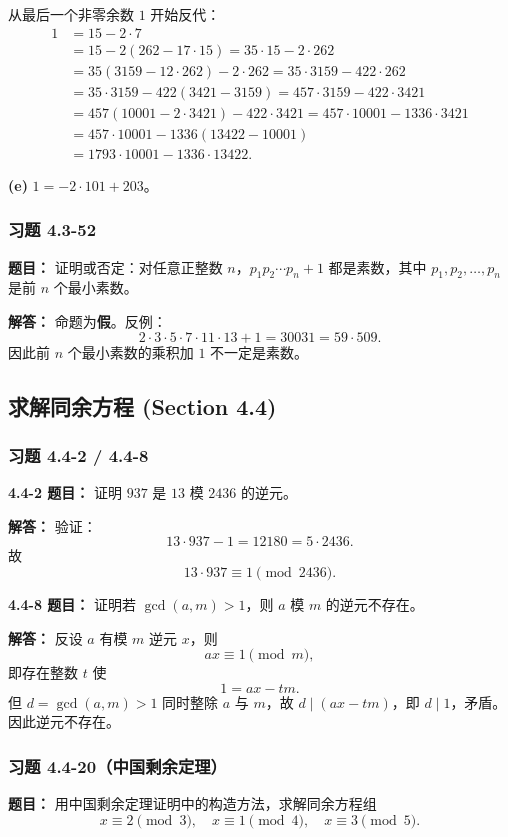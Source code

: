 \documentclass[11pt,UTF8]{article}
\begin{document}
从最后一个非零余数 $1$ 开始反代：
\begin{align*}
1 &= 15 - 2\cdot 7 \\
&= 15 - 2(262 - 17\cdot 15) = 35\cdot 15 - 2\cdot 262 \\
&= 35(3159 - 12\cdot 262) - 2\cdot 262 = 35\cdot 3159 - 422\cdot 262 \\
&= 35\cdot 3159 - 422(3421 - 3159) = 457\cdot 3159 - 422\cdot 3421 \\
&= 457(10001 - 2\cdot 3421) - 422\cdot 3421 = 457\cdot 10001 - 1336\cdot 3421 \\
&= 457\cdot 10001 - 1336(13422 - 10001) \\
&= \boxed{1793\cdot 10001 - 1336\cdot 13422}.
\end{align*}

\textbf{(e)} $\boxed{1 = -2\cdot 101 + 203}$。

\subsubsection*{习题 4.3-52}
\textbf{题目：} 证明或否定：对任意正整数 $n$，$p_1p_2\cdots p_n+1$ 都是素数，其中 $p_1,p_2,\dots,p_n$ 是前 $n$ 个最小素数。

\textbf{解答：} 命题为\textbf{假}。反例：
\[ 2\cdot 3\cdot 5\cdot 7\cdot 11\cdot 13 + 1 = 30031 = 59\cdot 509. \]
因此前 $n$ 个最小素数的乘积加 $1$ 不一定是素数。



\subsection{求解同余方程 (Section 4.4)}

\subsubsection*{习题 4.4-2 / 4.4-8}

\textbf{4.4-2 题目：} 证明 $937$ 是 $13$ 模 $2436$ 的逆元。

\textbf{解答：} 验证：
\[ 13\cdot 937 - 1 = 12180 = 5\cdot 2436. \]
故
\[ 13\cdot 937 \equiv 1\pmod{2436}. \]

\textbf{4.4-8 题目：} 证明若 $\gcd(a,m)>1$，则 $a$ 模 $m$ 的逆元不存在。

\textbf{解答：} 反设 $a$ 有模 $m$ 逆元 $x$，则
\[ ax \equiv 1\pmod m, \]
即存在整数 $t$ 使
\[ 1 = ax - tm. \]
但 $d=\gcd(a,m)>1$ 同时整除 $a$ 与 $m$，故 $d\mid(ax-tm)$，即 $d\mid 1$，矛盾。因此逆元不存在。

\subsubsection*{习题 4.4-20（中国剩余定理）}
\textbf{题目：} 用中国剩余定理证明中的构造方法，求解同余方程组
\[ x\equiv 2\pmod 3,\quad x\equiv 1\pmod 4,\quad x\equiv 3\pmod 5. \]
\end{document}
